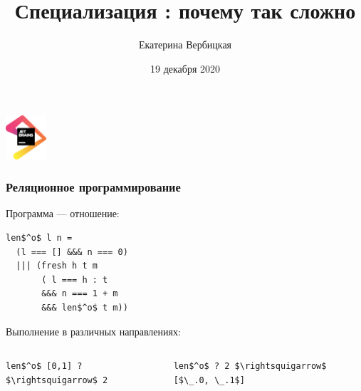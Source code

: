 \documentclass{beamer}
\title[]{Специализация \miniKanren: почему так сложно}
\institute[]{
Лаборатория языковых инструментов JetBrains
}
\author[Екатерина Вербицкая]{Екатерина Вербицкая}
\date{19 декабря 2020}
\begin{document}
{

\begin{frame}
      \begin{center}
        {\includegraphics[width=1.5cm]{pics/jb.png}}
      \end{center}

  \titlepage
\end{frame}
}

\begin{frame}[fragile]
  \frametitle{Реляционное программирование}

 \begin{center}
    Программа --- отношение:
 \end{center}

 \vspace{0.1cm}

  \begin{center}
    \begin{minipage}{3.5cm}
    \begin{lstlisting}[frame=single]
len$^o$ l n =
  (l === [] &&& n === 0)
  ||| (fresh h t m
       ( l === h : t
       &&& n === 1 + m
       &&& len$^o$ t m))
    \end{lstlisting}
    \end{minipage}
\end{center}

\vspace{0.3cm}

\begin{center}
  Выполнение в различных направлениях:
\end{center}

\vspace{-0.1cm}

\begin{columns}
  \begin{column}{0.45\textwidth}
    \begin{center}
      \begin{minipage}{0.45\textwidth}
        \lstinline{len$^o$ [0,1] ? $\rightsquigarrow$ 2}
      \end{minipage}
    \end{center}
  \end{column}
  \begin{column}{0.55\textwidth}
    \begin{center}
      \begin{minipage}{0.55\textwidth}
        \lstinline{len$^o$ ? 2 $\rightsquigarrow$ [$\_.0, \_.1$]}
      \end{minipage}
    \end{center}
  \end{column}
\end{columns}

\end{frame}
\end{document}
